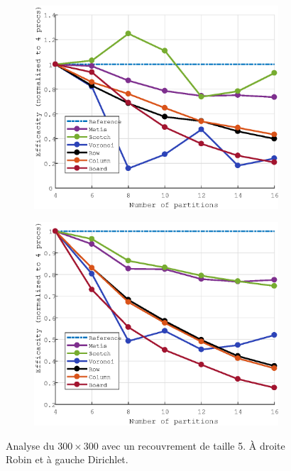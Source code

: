 \documentclass[a4paper,11pt]{article}
\begin{document}
\begin{figure}[H]\ContinuedFloat
	\begin{subfigure}[t]{0.45\textwidth}
		\centering
		\includegraphics[width=\textwidth]{robin_300x300_5_efficacity.eps}
	\end{subfigure}
	\hfill
	\begin{subfigure}[t]{0.45\textwidth}
		\centering
		\includegraphics[width=\textwidth]{dirichlet_300x300_5_efficacity.eps}
	\end{subfigure}
	\caption{Analyse du $300\times300$ avec un recouvrement de taille 5. À droite Robin et à gauche Dirichlet.}
\end{figure}
\end{document}

